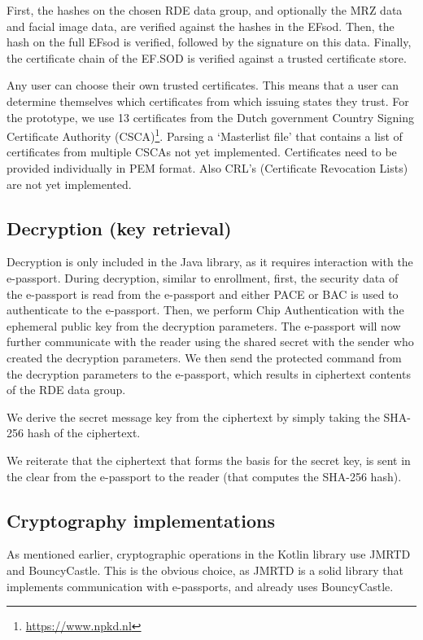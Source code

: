 First, the hashes on the chosen RDE data group, and optionally the MRZ data and facial image data, are verified against the hashes in the EFsod.
Then, the hash on the full EFsod is verified, followed by the signature on this data.
Finally, the certificate chain of the EF.SOD is verified against a trusted certificate store.

Any user can choose their own trusted certificates.
This means that a user can determine themselves which certificates from which issuing states they trust.
For the prototype, we use 13 certificates from the Dutch government Country Signing Certificate Authority (CSCA)\footnote{\url{https://www.npkd.nl}}.
Parsing a `Masterlist file' that contains a list of certificates from multiple CSCAs not yet implemented.
Certificates need to be provided individually in PEM format.
Also CRL's (Certificate Revocation Lists) are not yet implemented.

\subsection{Decryption (key retrieval)}\label{subsec:decryption-key-retrieval}
Decryption is only included in the Java library, as it requires interaction with the e-passport.
During decryption, similar to enrollment, first, the security data of the e-passport is read from the e-passport and either PACE or BAC is used to authenticate to the e-passport.
Then, we perform Chip Authentication with the ephemeral public key from the decryption parameters.
The e-passport will now further communicate with the reader using the shared secret with the sender who created the decryption parameters.
We then send the protected command from the decryption parameters to the e-passport, which results in ciphertext contents of the RDE data group.

We derive the secret message key from the ciphertext by simply taking the SHA-256 hash of the ciphertext.

We reiterate that the ciphertext that forms the basis for the secret key, is sent in the clear from the e-passport to the reader (that computes the SHA-256 hash).

\subsection{Cryptography implementations}\label{subsec:cryptography-implementations}
As mentioned earlier, cryptographic operations in the Kotlin library use JMRTD and BouncyCastle.
This is the obvious choice, as JMRTD is a solid library that implements communication with e-passports, and already uses BouncyCastle.

